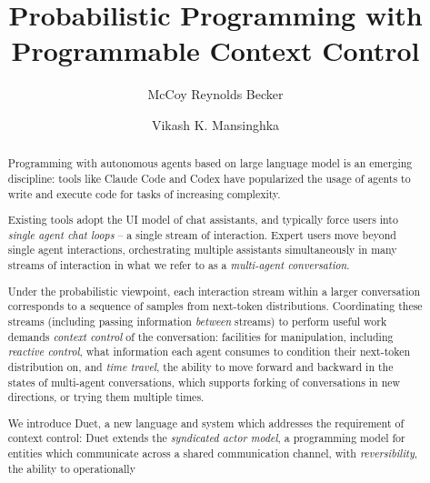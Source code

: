 \documentclass[sigplan,screen]{acmart}
\begin{document}
\title{Probabilistic Programming with Programmable Context Control}

\author{McCoy Reynolds Becker}

\author{Vikash K. Mansinghka}

\begin{abstract}
  Programming with autonomous agents based on large language model is an emerging discipline: 
  tools like Claude Code and Codex have popularized the usage of agents to write and execute code for 
  tasks of increasing complexity.
  
  Existing tools adopt the UI model of chat assistants, and typically force users into 
  \textit{single agent chat loops} -- a single stream of interaction. Expert users move beyond single agent interactions,
  orchestrating multiple assistants simultaneously in many streams of interaction in what we refer to as a
  \textit{multi-agent conversation}.

  Under the probabilistic viewpoint, each interaction stream within a larger conversation 
  corresponds to a sequence of samples from next-token distributions.
  Coordinating these streams (including passing information \textit{between} streams) to perform useful work 
  demands \emph{context control} of the conversation: facilities for manipulation, including \textit{reactive control}, 
  what information each agent consumes to condition their next-token distribution on, 
  and \textit{time travel}, the ability to move forward and backward in the states of multi-agent conversations, 
  which supports forking of conversations in new directions, or trying them multiple times.

  We introduce Duet, a new language and system which addresses the requirement of
  context control: 
  Duet extends the \textit{syndicated actor model},
  a programming model for entities which communicate across a shared communication channel, 
  with \textit{reversibility}, the ability to operationally 
\end{abstract}


\maketitle
\end{document}
